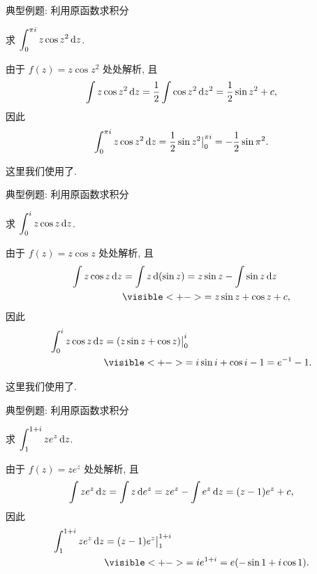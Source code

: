 \begin{frame}{典型例题: 利用原函数求积分}
\begin{example}
求 $\displaystyle\int_0^{\pi i}z\cos z^2\,\mathrm{d} z$.
\end{example}
\begin{solution}
由于 $f(z)=z\cos z^2$ 处处解析,
\onslide<+->
且
\[\int z\cos z^2\,\mathrm{d} z=\frac12\int \cos z^2\,\mathrm{d} z^2=\frac12\sin z^2+c,\]
\onslide<+->
因此
\[\int_0^{\pi i}z\cos z^2\,\mathrm{d} z=\frac12\sin z^2\big|_0^{\pi i}=-\frac12\sin \pi^2.\]
\end{solution}
\onslide<+->
这里我们使用了.
\end{frame}


\begin{frame}{典型例题: 利用原函数求积分}
\beqskip{3pt}
\begin{example}
求 $\displaystyle\int_0^i z\cos z\,\mathrm{d} z$.
\end{example}
\begin{solution}
由于 $f(z)=z\cos z$ 处处解析,
\onslide<+->
且
\begin{align*}
\int z\cos z\diff z&
=\int z\diff(\sin z)=z\sin z-\int \sin z\diff z\\
&\visible<+->{=z\sin z+\cos z+c,}
\end{align*}
\onslide<+->
因此
\begin{align*}
\int_0^i z\cos z\diff z&=(z\sin z+\cos z)\big|_0^i\\
&\visible<+->{=i\sin i+\cos i-1=e^{-1}-1.}
\end{align*}
\end{solution}
\onslide<+->
这里我们使用了.
\endgroup
\end{frame}


\begin{frame}{典型例题: 利用原函数求积分}
\beqskip{10pt}
\begin{example}
求 $\displaystyle\int_1^{1+i} z e^z\,\mathrm{d} z$.
\end{example}
\begin{solution}
由于 $f(z)=ze^z$ 处处解析,
\onslide<+->
且
\[\int z e^z\,\mathrm{d} z=\int z\,\mathrm{d} e^z=ze^z-\int e^z\,\mathrm{d} z=(z-1)e^z+c,\]
\onslide<+->
因此
\begin{align*}
\int_1^{1+i} z e^z\diff z&=(z-1)e^z\big|_1^{1+i}\\
&\visible<+->{=ie^{1+i}=e(-\sin 1+i\cos 1).}
\end{align*}
\end{solution}
\endgroup
\end{frame}



